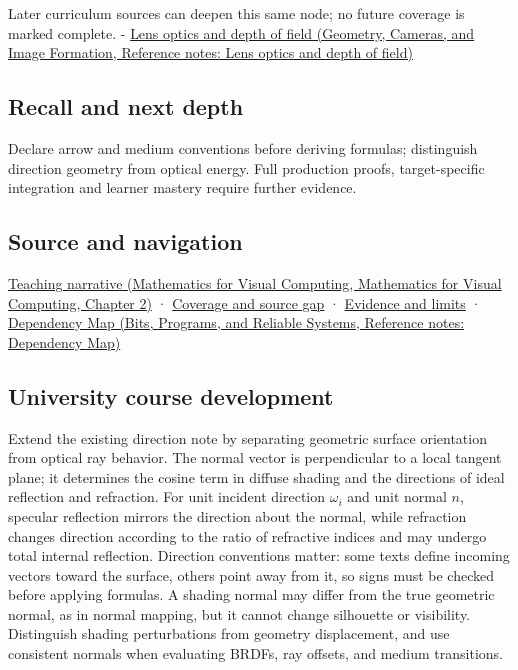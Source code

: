 Later curriculum sources can deepen this same node; no future coverage is marked complete. - \href{../03-Geometry-Cameras-and-Image-Formation/main.pdf\#nameddest=appendix-21f8456e2629}{Lens optics and depth of field (Geometry, Cameras, and Image Formation, Reference notes: Lens optics and depth of field)}

\subsection{Recall and next depth}\label{appendix-44e00863b4d5-recall-and-next-depth}

Declare arrow and medium conventions before deriving formulas; distinguish direction geometry from optical energy. Full production proofs, target-specific integration and learner mastery require further evidence.

\subsection{Source and navigation}\label{appendix-44e00863b4d5-source-and-navigation}

\href{../02-Mathematics-for-Visual-Computing/main.pdf\#nameddest=01-foundations-i-ch018-light-uses-the-same-decomposition-in-a-new-role}{Teaching narrative (Mathematics for Visual Computing, Mathematics for Visual Computing, Chapter 2)} · \hyperref[appendix-fd090d982a15-phase-6---parts-501-600]{Coverage and source gap} · \hyperref[appendix-a103e7846d21-phase-6---source-analysis-and-verification]{Evidence and limits} · \href{../01-Bits-Programs-and-Reliable-Systems/main.pdf\#nameddest=appendix-4ad47bdd269a}{Dependency Map (Bits, Programs, and Reliable Systems, Reference notes: Dependency Map)}

\subsection{University course development}\label{appendix-44e00863b4d5-university-course-development}

Extend the existing direction note by separating geometric surface orientation from optical ray behavior. The normal vector is perpendicular to a local tangent plane; it determines the cosine term in diffuse shading and the directions of ideal reflection and refraction. For unit incident direction \(\omega_i\) and unit normal \(n\), specular reflection mirrors the direction about the normal, while refraction changes direction according to the ratio of refractive indices and may undergo total internal reflection. Direction conventions matter: some texts define incoming vectors toward the surface, others point away from it, so signs must be checked before applying formulas. A shading normal may differ from the true geometric normal, as in normal mapping, but it cannot change silhouette or visibility. Distinguish shading perturbations from geometry displacement, and use consistent normals when evaluating BRDFs, ray offsets, and medium transitions.

